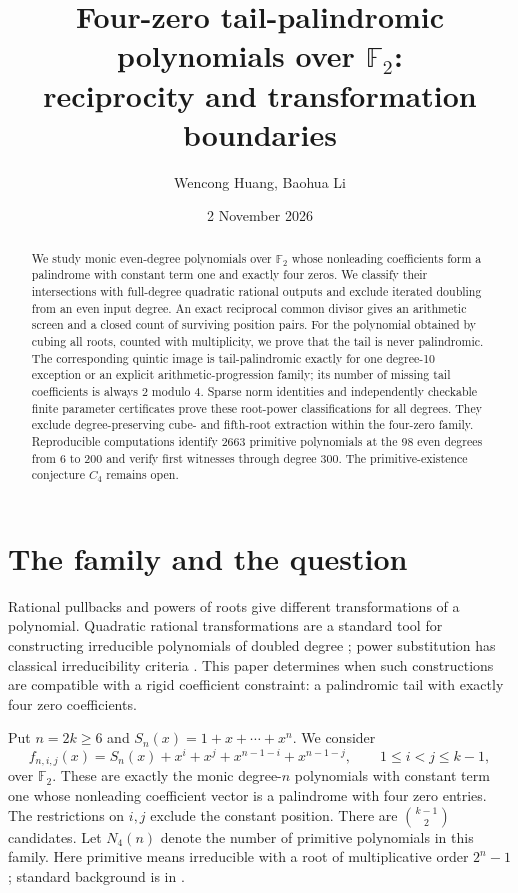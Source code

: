 \documentclass[11pt]{article}
\title{\Large Four-zero tail-palindromic polynomials over $\mathbb F_2$:\\
reciprocity and transformation boundaries}
\author{Wencong Huang, Baohua Li}
\date{2 November 2026}
\theoremstyle{definition}
\theoremstyle{remark}
\begin{document}
\maketitle
\begin{abstract}
We study monic even-degree polynomials over $\mathbb F_2$ whose nonleading coefficients form a palindrome with constant term one and exactly four zeros. We classify their intersections with full-degree quadratic rational outputs and exclude iterated doubling from an even input degree. An exact reciprocal common divisor gives an arithmetic screen and a closed count of surviving position pairs. For the polynomial obtained by cubing all roots, counted with multiplicity, we prove that the tail is never palindromic. The corresponding quintic image is tail-palindromic exactly for one degree-10 exception or an explicit arithmetic-progression family; its number of missing tail coefficients is always $2$ modulo $4$. Sparse norm identities and independently checkable finite parameter certificates prove these root-power classifications for all degrees. They exclude degree-preserving cube- and fifth-root extraction within the four-zero family. Reproducible computations identify 2663 primitive polynomials at the 98 even degrees from 6 to 200 and verify first witnesses through degree 300. The primitive-existence conjecture $C_4$ remains open.
\end{abstract}

\section{The family and the question}\label{sec:intro}
Rational pullbacks and powers of roots give different transformations
of a polynomial. Quadratic rational transformations are a standard
tool for constructing irreducible polynomials of doubled degree
\cite{MP17}; power substitution has classical irreducibility criteria
\cite[Section 2]{BM25}. This paper determines when such constructions
are compatible with a rigid coefficient constraint: a palindromic
tail with exactly four zero coefficients.

Put $n=2k\ge6$ and $S_n(x)=1+x+\cdots+x^n$. We consider
\begin{equation}\label{eq:candidate}
 f_{n,i,j}(x)=S_n(x)+x^i+x^j+x^{n-1-i}+x^{n-1-j},
 \qquad 1\le i<j\le k-1,
\end{equation}
over $\mathbb F_2$. These are exactly the monic degree-$n$ polynomials
with constant term one whose nonleading coefficient vector is a
palindrome with four zero entries. The restrictions on $i,j$ exclude
the constant position. There are $\binom{k-1}{2}$ candidates.
Let $N_4(n)$ denote the number of primitive polynomials in this family.
Here primitive means irreducible with a root of multiplicative order
$2^n-1$; standard background is in \cite{LN}.
\end{document}
